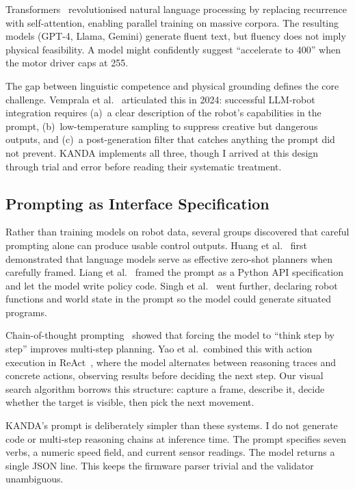 Transformers~\cite{vaswani2017attention} revolutionised natural language processing by replacing recurrence with self-attention, enabling parallel training on massive corpora. The resulting models (GPT-4, Llama, Gemini) generate fluent text, but fluency does not imply physical feasibility. A model might confidently suggest ``accelerate to 400'' when the motor driver caps at 255.

The gap between linguistic competence and physical grounding defines the core challenge. Vemprala et al.~\cite{vemprala2024chatgpt} articulated this in 2024: successful LLM-robot integration requires (a)~a clear description of the robot's capabilities in the prompt, (b)~low-temperature sampling to suppress creative but dangerous outputs, and (c)~a post-generation filter that catches anything the prompt did not prevent. KANDA implements all three, though I arrived at this design through trial and error before reading their systematic treatment.


\subsection{Prompting as Interface Specification}
\label{subsec:prompting}

Rather than training models on robot data, several groups discovered that careful prompting alone can produce usable control outputs. Huang et al.~\cite{huang2022zeroshot} first demonstrated that language models serve as effective zero-shot planners when carefully framed. Liang et al.~\cite{liang2023code} framed the prompt as a Python API specification and let the model write policy code. Singh et al.~\cite{singh2023progprompt} went further, declaring robot functions and world state in the prompt so the model could generate situated programs.

Chain-of-thought prompting~\cite{wei2022cot} showed that forcing the model to ``think step by step'' improves multi-step planning. Yao et al.\ combined this with action execution in ReAct~\cite{yao2023react}, where the model alternates between reasoning traces and concrete actions, observing results before deciding the next step. Our visual search algorithm borrows this structure: capture a frame, describe it, decide whether the target is visible, then pick the next movement.

KANDA's prompt is deliberately simpler than these systems. I do not generate code or multi-step reasoning chains at inference time. The prompt specifies seven verbs, a numeric speed field, and current sensor readings. The model returns a single JSON line. This keeps the firmware parser trivial and the validator unambiguous.


